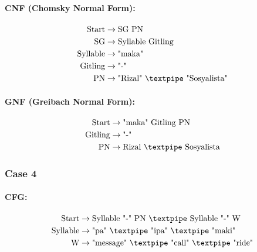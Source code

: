 \paragraph{CNF (Chomsky Normal Form):}

\begin{equation*}
    \begin{aligned}
        \text{Start}   & \rightarrow \text{SG PN} \\
        \text{SG}      & \rightarrow \text{Syllable Gitling}\\
        \text{Syllable}    & \rightarrow \text{"maka"}\\
        \text{Gitling} & \rightarrow \text{"-"}\\
        \text{PN} & \rightarrow \text{"Rizal" {\textpipe} "Sosyalista"}   \\
    \end{aligned}
\end{equation*}

\paragraph{GNF (Greibach Normal Form):}

\begin{equation*}
    \begin{aligned}
        \text{Start}   & \rightarrow \text{"maka" Gitling PN}\\
        \text{Gitling} & \rightarrow \text{"-"}\\
        \text{PN} & \rightarrow \text{Rizal {\textpipe} Sosyalista}   \\
    \end{aligned}
\end{equation*}

\subsubsection{Case 4}

\paragraph{CFG:}

\begin{equation*}
    \begin{aligned}
        \text{Start}  & \rightarrow \text{Syllable "-" PN {\textpipe} Syllable "-" W}   \\
        \text{Syllable}    & \rightarrow \text{"pa" {\textpipe} "ipa" {\textpipe} "maki"}\\        
        \text{W} & \rightarrow \text{"message" {\textpipe} "call" {\textpipe} "ride"}   \\
    \end{aligned}
\end{equation*}

